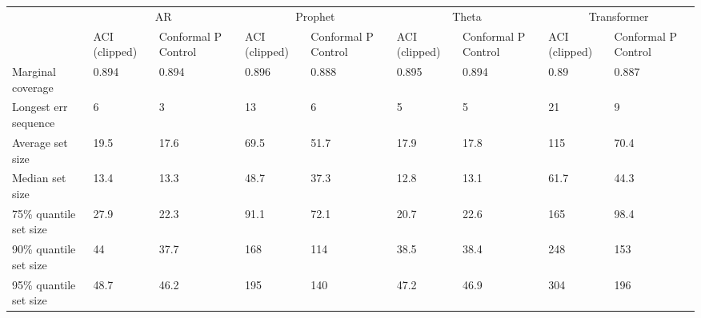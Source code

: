 \begin{tabular}{lllllllll}
\toprule
& \multicolumn{2}{c}{AR}& \multicolumn{2}{c}{Prophet}& \multicolumn{2}{c}{Theta}& \multicolumn{2}{c}{Transformer} \\
& ACI (clipped) & Conformal P Control & ACI (clipped) & Conformal P Control & ACI (clipped) & Conformal P Control & ACI (clipped) & Conformal P Control \\
\midrule
Marginal coverage & 0.894 & 0.894 & 0.896 & 0.888 & 0.895 & 0.894 & 0.89 & 0.887 \\
Longest err sequence & 6 & 3 & 13 & 6 & 5 & 5 & 21 & 9 \\
Average set size & 19.5 & 17.6 & 69.5 & 51.7 & 17.9 & 17.8 & 115 & 70.4 \\
Median set size & 13.4 & 13.3 & 48.7 & 37.3 & 12.8 & 13.1 & 61.7 & 44.3 \\
75\% quantile set size & 27.9 & 22.3 & 91.1 & 72.1 & 20.7 & 22.6 & 165 & 98.4 \\
90\% quantile set size & 44 & 37.7 & 168 & 114 & 38.5 & 38.4 & 248 & 153 \\
95\% quantile set size & 48.7 & 46.2 & 195 & 140 & 47.2 & 46.9 & 304 & 196 \\
\bottomrule
\end{tabular}
